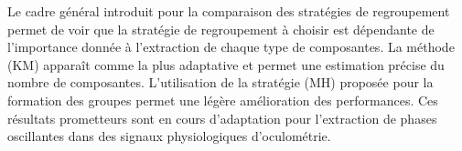 \documentclass{gretsi}
\begin{document}
Le cadre général introduit pour la comparaison des stratégies de regroupement permet de voir que la stratégie de regroupement à choisir est dépendante de l'importance donnée à l'extraction de chaque type de composantes.
La méthode (KM) apparaît comme la plus adaptative et permet une estimation précise du nombre de composantes.
L'utilisation de la stratégie (MH) proposée pour la formation des groupes permet une légère amélioration des performances.
Ces résultats prometteurs sont en cours d'adaptation pour l'extraction de phases oscillantes dans des signaux physiologiques d'oculométrie.


 
\scriptsize
{}
\end{document}
